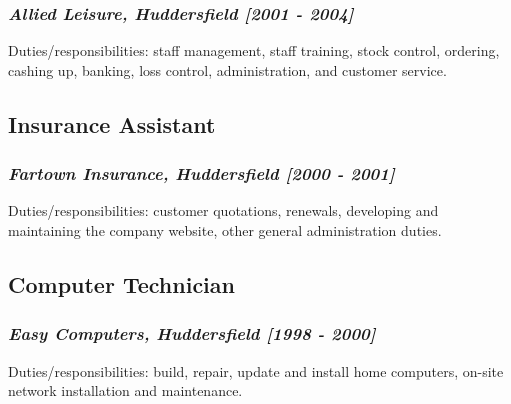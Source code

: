 \documentclass{article}
\begin{document}
\subsubsection*{\emph{Allied Leisure, Huddersfield [2001 - 2004]}}
\label{sec-3.3.1}

Duties/responsibilities: staff management, staff training, stock control, ordering, cashing up, banking, loss control, administration, and customer service.
\subsection*{Insurance Assistant}
\label{sec-3.4}

\subsubsection*{\emph{Fartown Insurance, Huddersfield [2000 - 2001]}}
\label{sec-3.4.1}

Duties/responsibilities: customer quotations, renewals, developing and maintaining the company website, other general administration duties.
\subsection*{Computer Technician}
\label{sec-3.5}

\subsubsection*{\emph{Easy Computers, Huddersfield [1998 - 2000]}}
\label{sec-3.5.1}

Duties/responsibilities: build, repair, update and install home computers, on-site network installation and maintenance.
\end{document}

